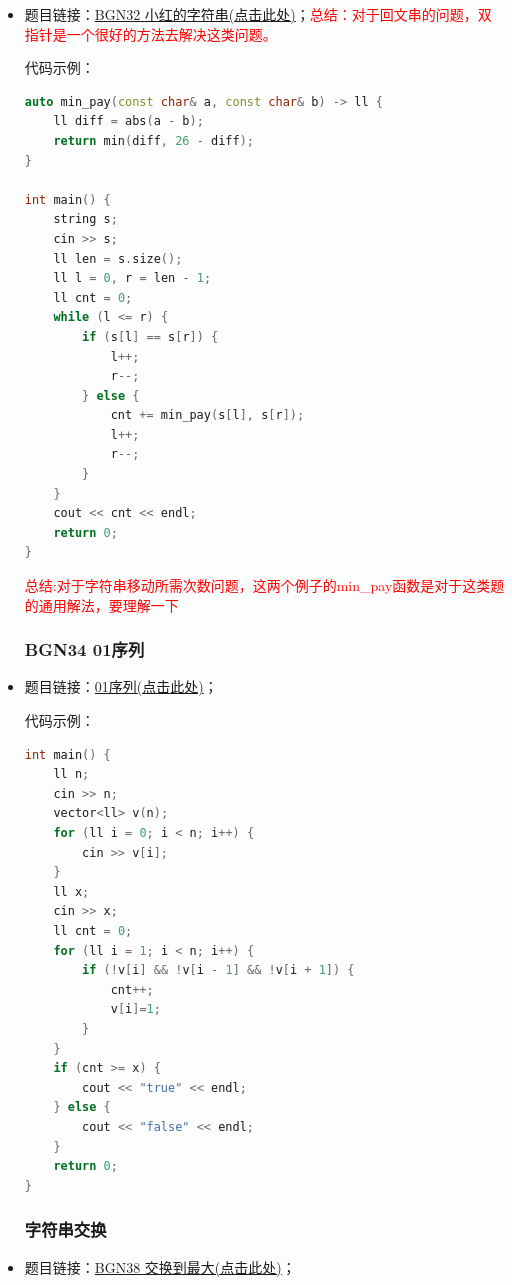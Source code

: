 \begin{itemize}
\item 题目链接：\href{https://www.nowcoder.com/practice/f9738786c00a40a2b7ddf6c82c1a59b1?tpId=385&tqId=10964257&sourceUrl=%2Fexam%2Foj%3FquestionJobId%3D10%26subTabName%3Donline_coding_page}{BGN32 小红的字符串(点击此处)}；\textcolor{red}{总结：对于回文串的问题，双指针是一个很好的方法去解决这类问题。}

代码示例：\\
\begin{lstlisting}[language=C++]
auto min_pay(const char& a, const char& b) -> ll {
	ll diff = abs(a - b);
	return min(diff, 26 - diff);
}

int main() {
	string s;
	cin >> s;
	ll len = s.size();
	ll l = 0, r = len - 1;
	ll cnt = 0;
	while (l <= r) {
		if (s[l] == s[r]) {
			l++;
			r--;
		} else {
			cnt += min_pay(s[l], s[r]);
			l++;
			r--;
		}
	}
	cout << cnt << endl;
	return 0;
}
\end{lstlisting}
\textcolor{red}{总结:对于字符串移动所需次数问题，这两个例子的min\_pay函数是对于这类题的通用解法，要理解一下}
\subsubsection{BGN34 01序列}
\item 题目链接：\href{https://www.nowcoder.com/practice/b0c948dbe577485598b982a430d65c39?tpId=385&tags=&title=&difficulty=0&judgeStatus=0&rp=0&sourceUrl=%2Fexam%2Foj%3FquestionJobId%3D10%26subTabName%3Donline_coding_page}{01序列(点击此处)}；

代码示例：\\
\begin{lstlisting}[language=C++]
int main() {
	ll n;
	cin >> n;
	vector<ll> v(n);
	for (ll i = 0; i < n; i++) {
		cin >> v[i];
	}
	ll x;
	cin >> x;
	ll cnt = 0;
	for (ll i = 1; i < n; i++) {
		if (!v[i] && !v[i - 1] && !v[i + 1]) {
			cnt++;
			v[i]=1;
		}
	}
	if (cnt >= x) {
		cout << "true" << endl;
	} else {
		cout << "false" << endl;
	}
	return 0;
}
\end{lstlisting}
\subsubsection{字符串交换}
\item 题目链接：\href{https://www.nowcoder.com/practice/73fd35bbfaa5483d8aa8b03cd27887a8?tpId=385&tags=&title=&difficulty=0&judgeStatus=0&rp=0&sourceUrl=%2Fexam%2Foj%3FquestionJobId%3D10%26subTabName%3Donline_coding_page}{BGN38 交换到最大(点击此处)}；


\end{itemize}
